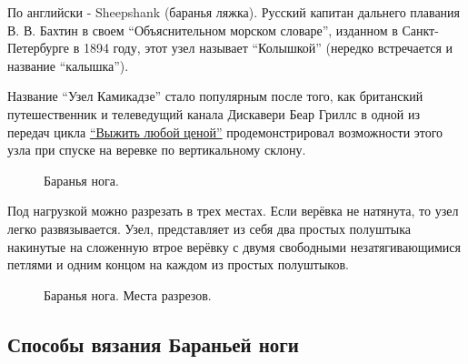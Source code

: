По английски - Sheepshank (баранья ляжка). Русский капитан дальнего плавания В. В. Бахтин в своем \enquote{Объяснительном морском словаре}, изданном в Санкт-Петербурге в 1894 году, этот узел называет \enquote{Колышкой} (нередко встречается и название \enquote{калышка}).

Название \enquote{Узел Камикадзе} стало популярным после того, как британский путешественник и телеведущий канала Дискавери Беар Гриллс в одной из передач цикла \href{http://www.youtube.com/watch?v=mtgCO17QA6U||Bear}{\enquote{Выжить любой ценой}} продемонстрировал возможности этого узла при спуске на веревке по вертикальному склону.

\begin{figure}[H]\centering
	\begin{minipage}{1\linewidth}
		\begin{center}
			\tcbox[enhanced jigsaw,colframe=black,opacityframe=0.5,opacityback=0.5]
			{\centering{}}
		\end{center}
	\end{minipage}
\caption{Баранья нога.}
\label{ris:Sheepshank_Knot}
\end{figure}

Под нагрузкой можно разрезать в трех местах. Если верёвка не натянута, то узел легко развязывается. Узел, представляет из себя два простых полуштыка накинутые на сложенную втрое верёвку с двумя свободными незатягивающимися петлями и одним концом на каждом из простых полуштыков.

\begin{figure}[H]\centering
	\begin{minipage}{1\linewidth}
		\begin{center}
			\tcbox[enhanced jigsaw,colframe=black,opacityframe=0.5,opacityback=0.5]
			{\centering{}}
		\end{center}
	\end{minipage}
\caption{Баранья нога. Места разрезов.}
\label{ris:Sheepshank_Knot_kut}
\end{figure}

\subsection{Способы вязания Бараньей ноги}

\begin{figure}[H]\centering
\hfil
\end{figure}


